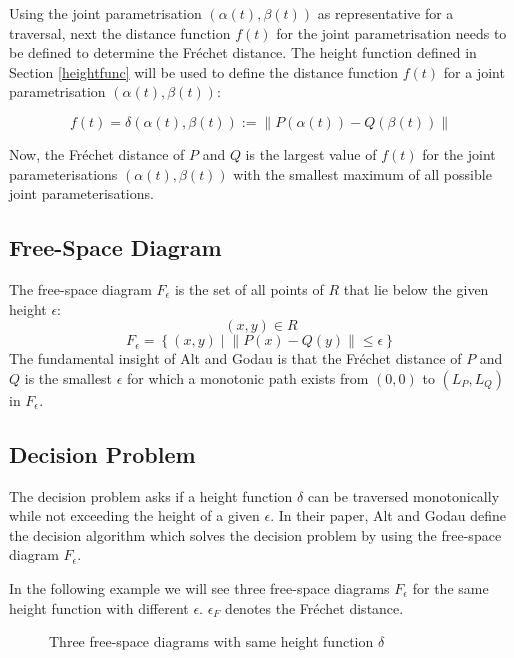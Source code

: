 Using the joint parametrisation $(\alpha(t), \beta(t))$ as representative for a traversal, next the distance function $f(t)$ for the joint parametrisation needs to be defined to determine the Fréchet distance. The height function defined in Section \ref{heightfunc} will be used to define the distance function $f(t)$ for a joint parametrisation $(\alpha(t), \beta(t))$:

$$f(t) = \delta(\alpha(t), \beta(t)) := \left\| P(\alpha(t)) - Q(\beta(t)) \right\|$$

Now, the Fréchet distance of $P$ and $Q$ is the largest value of $f(t)$ for the joint parameterisations $(\alpha(t), \beta(t))$ with the smallest maximum of all possible joint parameterisations.

\subsection{Free-Space Diagram}
The free-space diagram  $F_\epsilon$ is the set of all points of $R$ that lie below the given height $\epsilon$:
$$(x, y) \in R$$
$$F_\epsilon = \left\{ (x, y) \mid \left\| P(x) - Q(y) \right\| \leq \epsilon \right\}$$
The fundamental insight of Alt and Godau\cite{altgodau} is that the Fréchet distance of $P$ and $Q$ is the smallest $\epsilon$ for which a monotonic path exists from $(0,0)$ to $(L_P, L_Q)$ in $F_\epsilon$.\cite{rotelex}

\subsection{Decision Problem}

The decision problem asks if a height function $\delta$ can be traversed monotonically while not exceeding the height of a given $\epsilon$. In their paper, Alt and Godau\cite{altgodau} define the decision algorithm which solves the decision problem by using the free-space diagram $F_{\epsilon}$.

In the following example we will see three free-space diagrams $F_\epsilon$ for the same height function with different $\epsilon$. $\epsilon_F$ denotes the Fréchet distance.

\begin{figure}[H]
    \centering
    
    \qquad
    \qquad
	\caption{Three free-space diagrams with same height function $\delta$\protect\footnotemark}
    \label{fig:freespace_decision}
\end{figure}

